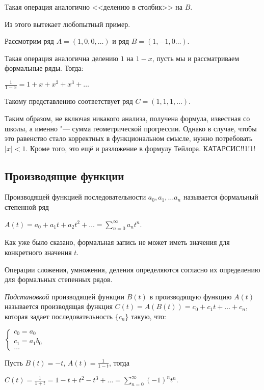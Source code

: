 Такая операция аналогично <<делению в столбик>> на $B$.

Из этого вытекает любопытный пример.
\begin{example}
    Рассмотрим ряд $A = (1, 0, 0, \dots)$ и ряд $B = (1, -1, 0 \dots)$.

    Такая операция аналогична делению $1$ на $1 - x$, пусть мы и
рассматриваем формальные ряды. Тогда:

$\displaystyle \frac{1}{1 - x} = 1 + x + x^2 + x^3 + \dots$
\end{example}
Такому представлению соответствует ряд $C = (1, 1, 1, \dots)$.

Таким образом, не включая никакого анализа, получена формула, известная со школы, а именно "--- сумма геометрической
прогрессии. Однако в случае, чтобы это равенство стало корректных в функциональном смысле,
нужно потребовать $|x| < 1$. Кроме того, это ещё и разложение в формулу Тейлора.
КАТАРСИС!!1!1!

\subsection{Производящие функции}

Производящей функцией последовательности $a_0, a_1, \dots a_n$ называется
формальный степенной ряд 

$A(t) = a_0 + a_1 t + a_2 t^2 + \dots = \sum\limits_{n = 0}^{\infty} a_n t^n$.

Как уже было сказано, формальная запись не может иметь значения для конкретного значения
$t$.

Операции сложения, умножения, деления определяются согласно
их определению для формальных степенных рядов.

\begin{definition}
    \textit{Подстановкой} производящей функции $B(t)$ в производящую функцию
    $A(t)$ называется производящая функция $C(t) = A(B(t)) = c_0 + c_1 t + \dots + c_n$,
    которая задает последовательность $\{c_n\}$ такую, что:

    $\begin{cases}
        c_0 = a_0 \\
        c_1 = a_1 b_0 \\
        \dots
    \end{cases}$
\end{definition}

\begin{example}
    Пусть $B(t) = -t$, $A(t) = \frac{1}{1 - t}$, тогда
    
    $\displaystyle C(t) = \frac{1}{1 + t} = 1 - t + t^2 - t^3 + \dots = \sum\limits_{n = 0}^\infty (-1)^n t^n$.
\end{example}

